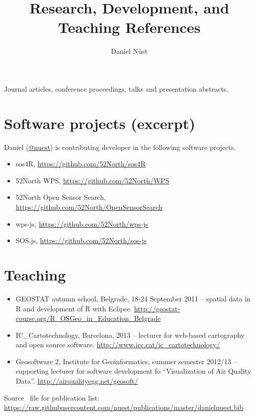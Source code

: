 \documentclass{article}
\title{Research, Development, and Teaching References\vspace{-2ex} %
}
\author{Daniel N\"ust}
\begin{document}
\maketitle

Journal articles, conference proceedings, talks and presentation abstracts.

\nocite{*}

%

%

\printbibliography


\section*{Software projects (excerpt)}

Daniel (\href{https://github.com/nuest/}{@nuest}) is contributing developer in the following software projects.

\begin{itemize}
	\item sos4R, \url{https://github.com/52North/sos4R}
	\item 52\degree North WPS, \url{https://github.com/52North/WPS}
	\item 52\degree North Open Sensor Search, \url{https://github.com/52North/OpenSensorSearch}
	\item wps-js, \url{https://github.com/52North/wps-js}
	\item SOS.js, \url{https://github.com/52North/sos-js}
\end{itemize}


\section*{Teaching}

\begin{itemize}
	\item GEOSTAT autumn school, Belgrade, 18-24 September 2011 -- spatial data in R and development of R with Eclipse. \url{ http://geostat-course.org/R_OSGeo_in_Education_Belgrade}
	\item IC\_Cartotechnology, Barcelona, 2013 -- lecturer for web-based cartography and open source software. \url{http://www.icc.cat/ic_cartotechnology/}
	\item Geosoftware 2, Institute for Geoinformatics, summer semester 2012/13 -- supporting lecturer for software development fo \enquote{Visualization of Air Quality Data}. \url{http://airqualityegg.net/geosoft/}
\end{itemize}

\vfill
Source \BibTeX \ file for publication list: \url{https://raw.githubusercontent.com/nuest/publications/master/danielnuest.bib}
\clearpage
\end{document}
